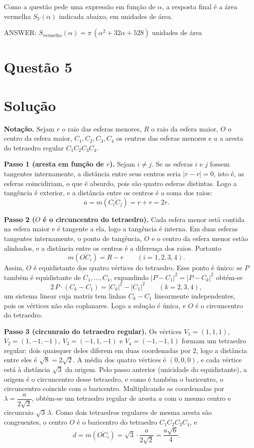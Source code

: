 \documentclass{article}%
\begin{document}
Como a questão pede uma expressão em função de $\alpha$, a resposta final é a área vermelha $S_V(\alpha)$ indicada abaixo, em unidades de área.

ANSWER: $S_{\text{vermelho}}(\alpha)=\pi\,(\alpha^2+32\alpha+528)$ unidades de área%
\newpage%
\section*{Questão 5}

\section*{Solução}

\textbf{Notação.} Sejam $r$ o raio das esferas menores, $R$ o raio da esfera maior, $O$ o centro da esfera maior, $C_1,C_2,C_3,C_4$ os centros das esferas menores e $a$ a aresta do tetraedro regular $C_1C_2C_3C_4$.

\textbf{Passo 1 (aresta em função de $r$).} Sejam $i\neq j$. Se as esferas $i$ e $j$ fossem tangentes internamente, a distância entre seus centros seria $|r-r|=0$, isto é, as esferas coincidiriam, o que é absurdo, pois são quatro esferas distintas. Logo a tangência é exterior, e a distância entre os centros é a soma dos raios:
\[
a = m(\overline{C_iC_j}) = r + r = 2r.
\]

\textbf{Passo 2 ($O$ é o circuncentro do tetraedro).} Cada esfera menor está contida na esfera maior e é tangente a ela, logo a tangência é interna. Em duas esferas tangentes internamente, o ponto de tangência, $O$ e o centro da esfera menor estão alinhados, e a distância entre os centros é a diferença dos raios. Portanto
\[
m(\overline{OC_i}) = R - r \qquad (i=1,2,3,4).
\]
Assim, $O$ é equidistante dos quatro vértices do tetraedro. Esse ponto é único: se $P$ também é equidistante de $C_1,\dots,C_4$, expandindo $|P-C_1|^2=|P-C_k|^2$ obtém-se
\[
2\,P\cdot(C_k-C_1)=|C_k|^2-|C_1|^2 \qquad (k=2,3,4),
\]
um sistema linear cuja matriz tem linhas $C_k-C_1$ linearmente independentes, pois os vértices não são coplanares. Logo a solução é única, e $O$ é o circuncentro do tetraedro.

\textbf{Passo 3 (circunraio do tetraedro regular).} Os vértices $V_1=(1,1,1)$, $V_2=(1,-1,-1)$, $V_3=(-1,1,-1)$ e $V_4=(-1,-1,1)$ formam um tetraedro regular: dois quaisquer deles diferem em duas coordenadas por $2$, logo a distância entre eles é $\sqrt{8}=2\sqrt{2}$. A média dos quatro vértices é $(0,0,0)$, e cada vértice está à distância $\sqrt{3}$ da origem. Pelo passo anterior (unicidade do equidistante), a origem é o circuncentro desse tetraedro, e como é também o baricentro, o circuncentro coincide com o baricentro. Multiplicando as coordenadas por $\lambda=\dfrac{a}{2\sqrt{2}}$, obtém-se um tetraedro regular de aresta $a$ com o mesmo centro e circunraio $\sqrt{3}\,\lambda$. Como dois tetraedros regulares de mesma aresta são congruentes, o centro $O$ é o baricentro do tetraedro $C_1C_2C_3C_4$, e
\[
d = m(\overline{OC_i}) = \sqrt{3}\cdot\frac{a}{2\sqrt{2}} = \frac{a\sqrt{6}}{4}.
\]
\end{document}

